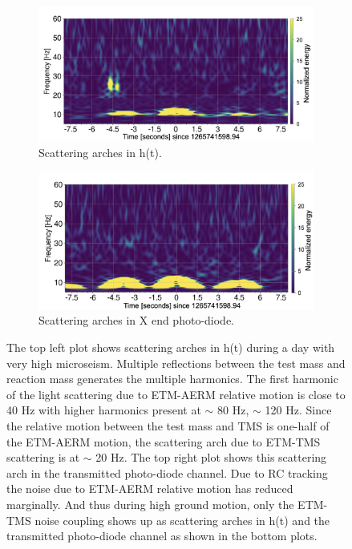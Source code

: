 \documentclass[12pt]{iopart}
\begin{document}
\begin{figure}[h]
     \par\bigskip
      \begin{subfigure}[b]{0.45\textwidth}
        \centering
         \includegraphics[width= \textwidth]{post_r0_darmomeg2.png}
         \caption{Scattering arches in h(t).}
         \label{fig:1265darm}
    \end{subfigure}
    \begin{subfigure}[b]{0.45\textwidth}
        \centering
         \includegraphics[width =\textwidth]{post_r0_transomeg2.png}
         \caption{Scattering arches in X end photo-diode.}
         \label{fig:1265trans}
     \end{subfigure}
     
     
    \caption{The top left plot shows scattering arches in h(t) during a day with very high microseism. Multiple reflections between the test mass and reaction mass generates the multiple harmonics. The first harmonic of the light scattering due to ETM-AERM relative motion is close to 40 Hz with higher harmonics present at $\sim$ 80 Hz, $\sim$ 120 Hz. Since the relative motion between the test mass and TMS is one-half of the ETM-AERM motion, the scattering arch due to ETM-TMS scattering is at $\sim$ 20 Hz. The top right plot shows this scattering arch in the transmitted photo-diode channel. Due to RC tracking the noise due to ETM-AERM relative motion has reduced marginally. And thus during high ground motion, only the ETM-TMS noise coupling shows up as scattering arches in h(t) and the transmitted photo-diode channel as shown in the bottom plots.}
    \label{fig:1262scat}
    
\end{figure}
\end{document}
